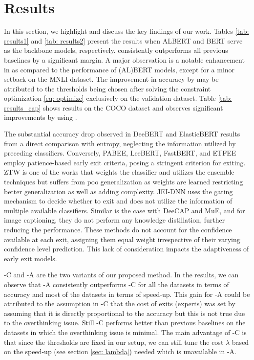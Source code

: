 \section{Results}\label{sec: results}
In this section, we highlight and discuss the key findings of our work. Tables \ref{tab: results1} and \ref{tab: results2} present the results when ALBERT and BERT serve as the backbone models, respectively. \algo{} consistently outperforms all previous baselines by a significant margin. A major observation is a notable enhancement in \algo{} as compared to the performance of (AL)BERT models, except for a minor setback on the MNLI dataset. The improvement in accuracy by \algo{} may be attributed to the thresholds being chosen after solving the constraint optimization \ref{eq: optimize} exclusively on the validation dataset. Table \ref{tab: results_cap} shows results on the COCO dataset and observes significant improvements by using \algo{}.

The substantial accuracy drop observed in DeeBERT and ElasticBERT results from a direct comparison with entropy, neglecting the information utilized by preceding classifiers. Conversely, PABEE, LeeBERT, FastBERT, and ETFEE employ patience-based early exit criteria, posing a stringent criterion for exiting. ZTW is one of the works that weights the classifier and utilizes the ensemble techniques but suffers from poo generalization as weights are learned restricting better generalization as well as adding complexity. JEI-DNN uses the gating mechanism to decide whether to exit and does not utilize the information of multiple available classifiers. Similar is the case with DeeCAP and MuE, and for image captioning, they do not perform any knowledge distillation, further reducing the performance. These methods do not account for the confidence available at each exit, assigning them equal weight irrespective of their varying confidence level prediction. This lack of consideration impacts the adaptiveness of early exit models.

\algo{}-C and \algo{}-A are the two variants of our proposed method. In the results, we can observe that \algo{}-A consistently outperforms \algo{}-C for all the datasets in terms of accuracy and most of the datasets in terms of speed-up. This gain for \algo{}-A could be attributed to the assumption in \algo{}-C that the cost of exits (experts) was set by assuming that it is directly proportional to the accuracy but this is not true due to the overthinking issue. Still \algo{}-C performs better than previous baselines on the datasets in which the overthinking issue is minimal. The main advantage of \algo{}-C is that since the thresholds are fixed in our setup, we can still tune the cost $\lambda$ based on the speed-up (see section \ref{sec: lambda}) needed which is unavailable in \algo{}-A.


